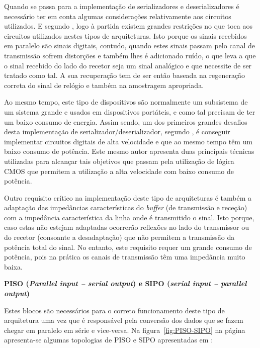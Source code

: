 Quando se passa para a implementação de serializadores e deserializadores é necessário ter em conta algumas considerações relativamente aos circuitos utilizados. E segundo \cite{R012}, logo à partida existem grandes restrições no que toca aos circuitos utilizados nestes tipos de arquiteturas. Isto porque os sinais recebidos em paralelo são sinais digitais, contudo, quando estes sinais passam pelo canal de transmissão sofrem distorções e também lhes é adicionado ruído, o que leva a que o sinal recebido do lado do recetor seja um sinal analógico e que necessite de ser tratado como tal. A sua recuperação tem de ser então baseada na regeneração correta do sinal de relógio e também na amostragem apropriada. 
	
Ao mesmo tempo, este tipo de dispositivos são normalmente um subsistema de um sistema grande e usados em dispositivos portáteis, e como tal precisam de ter um baixo consumo de energia. Assim sendo, um dos primeiros grandes desafios desta implementação de serializador/deserializador, segundo \cite{R012}, é conseguir implementar circuitos digitais de alta velocidade e que ao mesmo tempo têm um baixo consumo de potência. Este mesmo autor apresenta duas principais técnicas utilizadas para alcançar tais objetivos que passam pela utilização de lógica CMOS que permitem a utilização a alta velocidade com baixo consumo de potência. 
	
Outro requisito crítico na implementação deste tipo de arquiteturas é também a adaptação das impedâncias características do \textit{buffer} (de transmissão e receção) com a impedância característica da linha onde é transmitido o sinal. Isto porque, caso estas não estejam adaptadas ocorrerão reflexões no lado do transmissor ou do recetor (consoante a desadaptação) que não permitem a transmissão da potência total do sinal. No entanto, este requisito requer um grande consumo de potência, pois na prática os canais de transmissão têm uma impedância muito baixa. 
	
 \textbf{PISO (\textit{Parallel input – serial output}) e SIPO (\textit{serial input – parallel output})}
	
	\hspace{1.0em}Estes blocos são necessários para o correto funcionamento deste tipo de arquitetura uma vez que é responsável pela conversão dos dados que se fazem chegar em paralelo em série e vice-versa. Na figura~\ref{fig:PISO-SIPO} na página~\pageref{fig:PISO-SIPO} apresenta-se algumas topologias de PISO e SIPO apresentadas em \cite{R012}:

